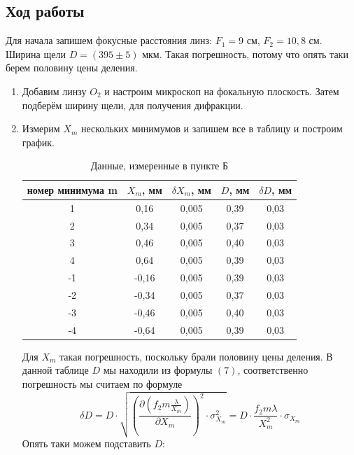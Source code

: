 \documentclass[a4paper, 12pt]{article}%
\begin{document}
\subsection*{Ход работы}
Для начала запишем фокусные расстояния линз: $F_1 = 9$ см, $F_2 = 10,8$ см. Ширина щели $D = (395 \pm 5)$ мкм. 
Такая погрешность, потому что опять таки берем половину цены деления.
\begin{enumerate}
\item Добавим линзу $O_2$ и настроим микроскоп на фокальную плоскость. Затем подберём ширину щели, для получения дифракции.
\item Измерим $X_m$ нескольких минимумов и запишем все в таблицу и построим график.

\begin{table}[h]
\begin{center}
\begin{tabular}{|c|c|c|c|c|}
\hline
номер минимума m & $X_m$, мм & $\delta X_m$, мм & $D$, мм & $\delta D$, мм \\ \hline
1                & 0,16      & 0,005             & 0,39    & 0,03          \\ \hline
2                & 0,34      & 0,005             & 0,37    & 0,03           \\ \hline
3                & 0,46      & 0,005             & 0,40    & 0,03           \\ \hline
4                & 0,64      & 0,005             & 0,39    & 0,03           \\ \hline
-1               & -0,16     & 0,005             & 0,39    & 0,03           \\ \hline
-2               & -0,34     & 0,005             & 0,37    & 0,03           \\ \hline
-3               & -0,46     & 0,005             & 0,40    & 0,03           \\ \hline
-4               & -0,64     & 0,005             & 0,39    & 0,03           \\ \hline
\end{tabular}
\caption{Данные, измеренные в пункте Б}
\end{center}
\end{table}

Для $X_m$ такая погрешность, поскольку брали половину цены деления. В данной таблице $D$ мы находили из формулы $(7)$, соответственно погрешность мы считаем по формуле
\[\delta D = D \cdot \sqrt{ \left(\dfrac{\partial \left(f_2 m \frac{\lambda}{X_m}\right)}{\partial X_m}\right)^{2} \cdot \sigma_{X_m}^2} = D \cdot\dfrac{f_2m \lambda}{X_m^2} \cdot \sigma_{X_m}\]
Опять таки можем подставить $D$: 


\end{enumerate}
\end{document}
